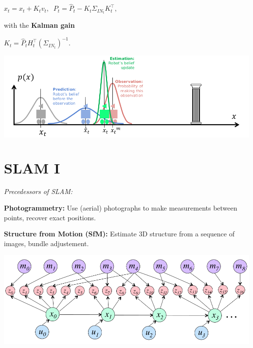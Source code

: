 \documentclass[landscape]{article}
\newcommand{\vmspace}{\vspace{-7pt}}
\newcommand{\vpspace}{\vspace{5pt}}
\begin{document}
\begin{multicols}{3}
\begin{minipage}{\columnwidth}
\begin{compactenum}
    \begin{center}
      $
      x_t = \hat x_t + K_t v_t,\;\;
      P_t = \hat P_t - K_t \Sigma_{IN_t}K_t^\intercal,
      $
    \end{center}

    with the \textbf{Kalman gain}

    \begin{center}
      $
      K_t = \hat P_t H_t^\intercal (\Sigma_{IN_t})^{-1}.
      $
    \end{center}

  \end{compactenum}
  \includegraphics[width=\columnwidth]{img/9_Kalman.png}
\end{minipage}



\vfill

\columnbreak

\section{SLAM I}

\vmspace

\begin{minipage}{\columnwidth}
  \textit{Precedessors of SLAM:}
  \begin{compactitem}
  \item \textbf{Photogrammetry:} Use (aerial) photographs to make measurements
    between points, recover exact positions.
  \item \textbf{Structure from Motion (SfM):} Estimate 3D structure from a
    sequence of images, bundle adjustement.
  \end{compactitem}
\end{minipage}

\vpspace

\includegraphics[width=\columnwidth]{img/10_SLAM.png}


\end{multicols}
\end{document}
